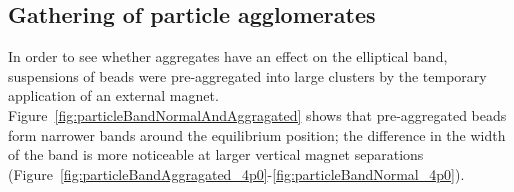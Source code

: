 

\subsection{Gathering of particle agglomerates}
In order to see whether aggregates have an effect on the elliptical band, suspensions of beads were pre-aggregated into large clusters by the temporary application of an external magnet. Figure~\ref{fig:particleBandNormalAndAggragated} shows that pre-aggregated beads form narrower bands around the equilibrium position; the difference in the width of the band is more noticeable at larger vertical magnet separations (Figure~\ref{fig:particleBandAggragated_4p0}-\ref{fig:particleBandNormal_4p0}).

